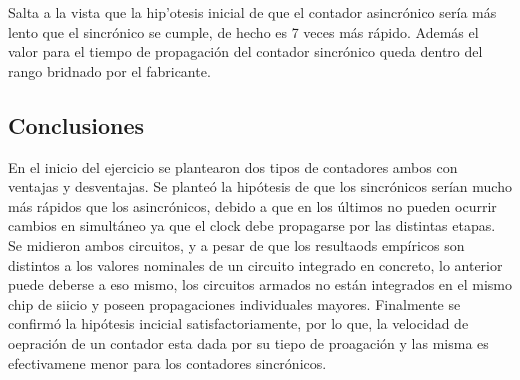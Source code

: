 Salta a la vista que la hip'otesis inicial de que el contador asincr\'onico ser\'ia m\'as lento que el sincr\'onico se cumple, de hecho es 7 veces m\'as r\'apido. Adem\'as el valor para el tiempo de propagaci\'on del contador sincr\'onico queda dentro del rango bridnado por el fabricante.

 
\subsection{Conclusiones}
En el inicio del ejercicio se plantearon dos tipos de contadores ambos con ventajas y desventajas. Se plante\'o la hip\'otesis de que los sincr\'onicos ser\'ian mucho m\'as r\'apidos que los asincr\'onicos, debido a que en los \'ultimos no pueden ocurrir cambios en simult\'aneo ya que el clock debe propagarse por las distintas etapas. Se midieron ambos circuitos, y a pesar de que los resultaods emp\'iricos son distintos a los valores nominales de un circuito integrado en concreto, lo anterior puede deberse a eso mismo, los circuitos armados no est\'an integrados en el mismo chip de siicio y poseen propagaciones individuales mayores. Finalmente se confirm\'o la hip\'otesis incicial satisfactoriamente, por lo que, la velocidad de oepraci\'on de un contador esta dada por su tiepo de proagaci\'on y las misma es efectivamene menor para los contadores sincr\'onicos. 
